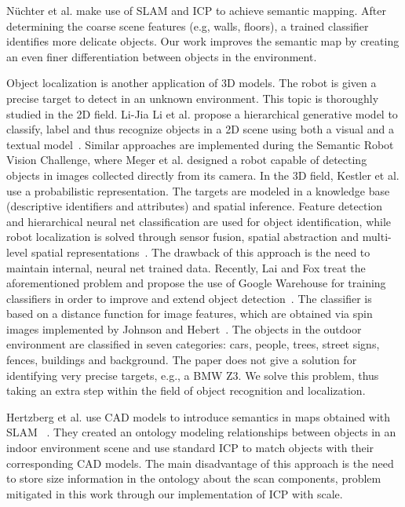 \documentclass{llncs}
\begin{document}
N\"uchter et al. \cite{Nuchter:2008} make use of SLAM and ICP to
achieve semantic mapping. After determining the coarse scene features
(e.g, walls, floors), a trained classifier identifies more delicate
objects. Our work improves the semantic map by creating an even finer
differentiation between objects in the environment.

Object localization is another application of 3D models. The robot is given a
precise target to detect in an unknown environment. This topic is thoroughly
studied in the 2D field. Li-Jia Li et al. propose a hierarchical generative
model to classify, label and thus recognize objects in a 2D scene using both a
visual and a textual model~\cite{Li:2009}. Similar approaches are implemented
during the Semantic Robot Vision Challenge, where Meger et al. designed a
robot capable of detecting objects in images collected directly from its
camera\cite{Meger:2008}. In the 3D field, Kestler et al. use a probabilistic
representation. The targets are modeled in a knowledge base (descriptive
identifiers and attributes) and spatial inference. Feature detection and
hierarchical neural net classification are used for object identification,
while robot localization is solved through sensor fusion, spatial abstraction
and multi-level spatial representations~\cite{Kestler:2000}. The drawback of
this approach is the need to maintain internal, neural net trained data.
Recently, Lai and Fox treat the aforementioned problem and propose the use of
Google Warehouse for training classifiers in order to improve and extend
object detection~\cite{Lai:2010}. The classifier is based on a distance
function for image features, which are obtained via spin images implemented by
Johnson and Hebert~\cite{Hebert:1999}. The objects in the outdoor environment
are classified in seven categories: cars, people, trees, street signs, fences,
buildings and background. The paper does not give a solution for identifying
very precise targets, e.g., a BMW Z3. We solve this problem, thus taking an
extra step within the field of object recognition and localization.

Hertzberg et al. use CAD models to introduce semantics in maps obtained with SLAM ~\cite{Hertzberg:2011}. They created an ontology modeling relationships between objects in an indoor environment scene and use standard ICP to match objects with their corresponding CAD models. The main disadvantage of this approach is the need to store size information in the ontology about the scan components, problem mitigated in this work through our implementation of ICP with scale.
\end{document}
